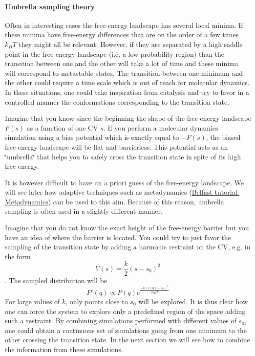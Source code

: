  \hypertarget{munster_munster-umbrella-sampling-theory}{}\paragraph{Umbrella sampling theory}\label{munster_munster-umbrella-sampling-theory}
Often in interesting cases the free-\/energy landscape has several local minima. If these minima have free-\/energy differences that are on the order of a few times $k_BT$ they might all be relevant. However, if they are separated by a high saddle point in the free-\/energy landscape (i.\+e. a low probability region) than the transition between one and the other will take a lot of time and these minima will correspond to metastable states. The transition between one minimum and the other could require a time scale which is out of reach for molecular dynamics. In these situations, one could take inspiration from catalysis and try to favor in a controlled manner the conformations corresponding to the transition state.

Imagine that you know since the beginning the shape of the free-\/energy landscape $ F(s) $ as a function of one C\+V $ s $. If you perform a molecular dynamics simulation using a bias potential which is exactly equal to $ -F(s) $, the biased free-\/energy landscape will be flat and barrierless. This potential acts as an \char`\"{}umbrella\char`\"{} that helps you to safely cross the transition state in spite of its high free energy.

It is however difficult to have an a priori guess of the free-\/energy landscape. We will see later how adaptive techniques such as metadynamics (\hyperlink{belfast-6}{Belfast tutorial\+: Metadynamics}) can be used to this aim. Because of this reason, umbrella sampling is often used in a slightly different manner.

Imagine that you do not know the exact height of the free-\/energy barrier but you have an idea of where the barrier is located. You could try to just favor the sampling of the transition state by adding a harmonic restraint on the C\+V, e.\+g. in the form \[ V(s)=\frac{k}{2} (s-s_0)^2 \]. The sampled distribution will be \[ P'(q)\propto P(q) e^{\frac{-k(s(q)-s_0)^2}{2k_BT}} \] For large values of $ k $, only points close to $ s_0 $ will be explored. It is thus clear how one can force the system to explore only a predefined region of the space adding such a restraint. By combining simulations performed with different values of $ s_0 $, one could obtain a continuous set of simulations going from one minimum to the other crossing the transition state. In the next section we will see how to combine the information from these simulations.



